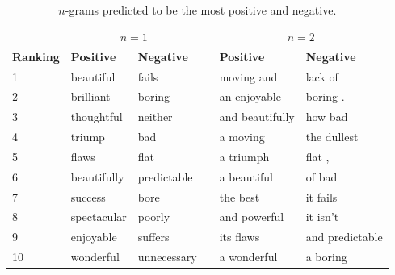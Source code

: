 \documentclass{article}
\newcommand{\ra}[1]{\renewcommand{\arraystretch}{#1}}
\begin{document}
\begin{table}[t]
    \centering

    \caption{$n$-grams predicted to be the most positive and negative.} 
    \label{tab:words}

    \ra{1.2}
    \begin{tabular}{@{} l l l c l l @{}}
        \\
        \toprule
        & \multicolumn{2}{c}{$n=1$} & \phantom{abc} & \multicolumn{2}{c}{$n=2$}\\
        \cmidrule{2-3} \cmidrule{5-6}
        \bf{Ranking} & \bf{Positive} & \bf{Negative} && \bf{Positive} & \bf{Negative} \\
        \midrule
        1 & beautiful   & fails         && moving and      & lack of \\
        2 & brilliant   & boring        && an enjoyable    & boring . \\
        3 & thoughtful  & neither       && and beautifully & how bad \\
        4 & triump      & bad           && a moving        & the dullest \\
        5 & flaws       & flat          && a triumph       & flat , \\
        6 & beautifully & predictable   && a beautiful     & of bad \\
        7 & success     & bore          && the best        & it fails \\
        8 & spectacular & poorly        && and powerful    & it isn't \\
        9 & enjoyable   & suffers       && its flaws       & and predictable \\
        10 & wonderful  & unnecessary   && a wonderful     & a boring \\
        \bottomrule
    \end{tabular}
\end{table}
\end{document}
